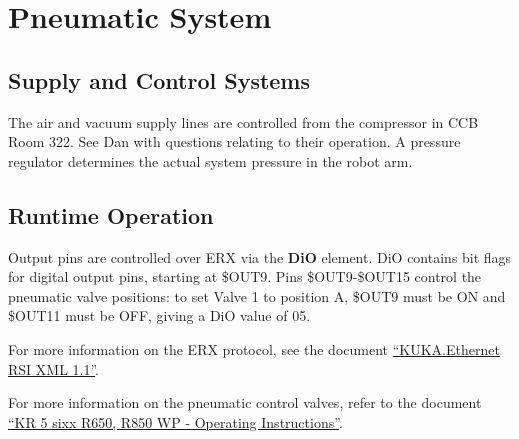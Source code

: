 \documentclass[12pt,letterpaper]{article}
\begin{document}
\section{Pneumatic System}
\subsection{Supply and Control Systems}
The air and vacuum supply lines are controlled from the compressor in CCB Room 322. See Dan with questions relating to their operation. A pressure regulator determines the actual system pressure in the robot arm.
\subsection{Runtime Operation}
Output pins are controlled over ERX via the \textbf{DiO} element. DiO contains bit flags for digital output pins, starting at \$OUT9. Pins \$OUT9-\$OUT15 control the pneumatic valve positions: to set Valve 1 to position A, \$OUT9 must be ON and \$OUT11 must be OFF, giving a DiO value of 05.

For more information on the ERX protocol, see the document \href{run:RSI_XML.pdf}{``KUKA.Ethernet RSI XML 1.1''}.

For more information on the pneumatic control valves, refer to the document \href{run:BA_KR_5_sixx_WP_en.pdf}{``KR 5 sixx R650, R850 WP - Operating Instructions''}.
\end{document}
